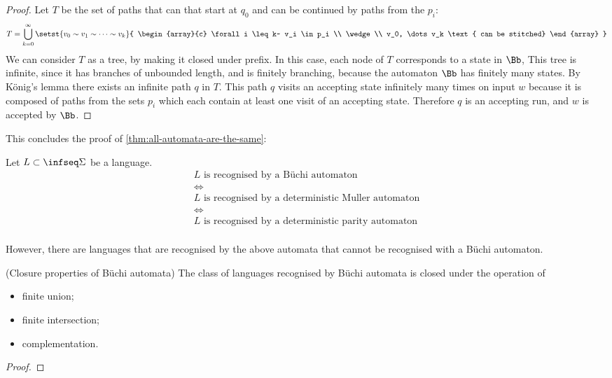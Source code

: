 \begin{proof}
    Let $T$ be the set of paths that can that start at $q_0$
    and can be continued by paths from the $p_i$:
    \[
        T = \bigcup_{k=0}^{\infty} \setst{
                v_0 \sim v_1 \sim \dots \sim v_k
            }{
                \begin{array}{c}
                    \forall i \leq k~
                    v_i \in p_i \\
                    \wedge \\
                    v_0, \dots v_k
                    \text{ can be stitched}
                \end{array}
            }
    \]
    We can consider $T$ as a tree, by making it closed under prefix.
    In this case, each node of $T$ corresponds to a state in $\Bb$,
    This tree is infinite,
    since it has branches of unbounded length, and is finitely branching,
    because the automaton $\Bb$ has finitely many states.
    By König's lemma there exists an infinite path $q$ in $T$.
    This path $q$ visits an accepting state infinitely many times
    on input $w$ because it is composed of paths from the sets $p_i$
    which each contain at least one visit of an accepting state.
    Therefore $q$ is an accepting run, and $w$ is accepted by $\Bb$.
\end{proof}

This concludes the proof of \autoref{thm:all-automata-are-the-same}:

\begin{theorem*}[\ref{thm:all-automata-are-the-same}]
    Let $L \subset \infseq\Sigma$ be a language.
    \[
        \begin{array}{c}
        L \text{ is recognised by a Büchi automaton} \\
        \iff \\
        L \text{ is recognised by a deterministic Muller automaton} \\
        \iff \\
        L \text{ is recognised by a deterministic parity automaton} \\
        \end{array}
    \]

    However, there are languages that are recognised by the above
    automata that cannot be recognised with a Büchi automaton.
\end{theorem*}

\begin{theorem}(Closure properties of Büchi automata)
    \label{thm:closure-of-buchi}
    The class of languages recognised by Büchi automata
    is closed under the operation of \begin{itemize}
        \item finite union;
        \item finite intersection;
        \item complementation.
    \end{itemize}
\end{theorem}
\begin{proof}
\end{proof}

